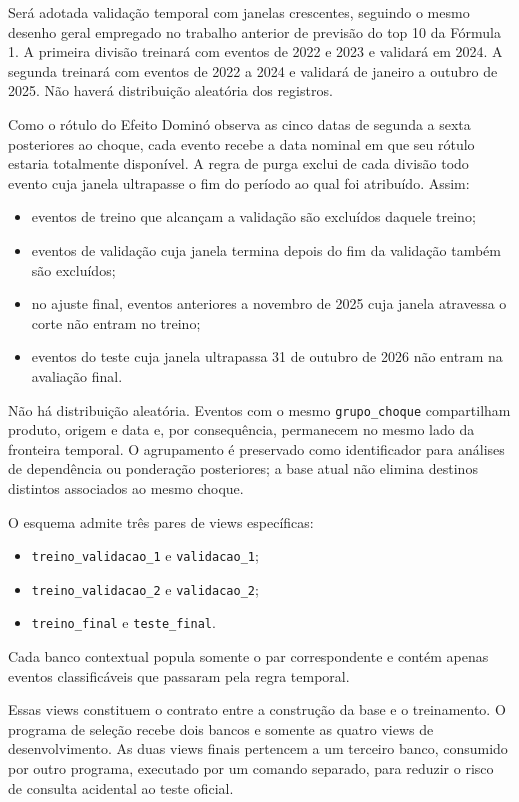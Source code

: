 \documentclass[12pt,a4paper]{article}
\begin{document}
Será adotada validação temporal com janelas crescentes, seguindo o mesmo desenho
geral empregado no trabalho anterior de previsão do top 10 da Fórmula 1. A
primeira divisão treinará com eventos de 2022 e 2023 e validará em 2024. A
segunda treinará com eventos de 2022 a 2024 e validará de janeiro a outubro de
2025. Não haverá distribuição aleatória dos registros.

Como o rótulo do Efeito Dominó observa as cinco datas de segunda a sexta
posteriores ao choque, cada evento recebe a data nominal em que seu rótulo
estaria totalmente disponível. A regra de purga exclui de cada divisão todo evento cuja janela
ultrapasse o fim do período ao qual foi atribuído. Assim:

\begin{itemize}
    \item eventos de treino que alcançam a validação são excluídos daquele
    treino;
    \item eventos de validação cuja janela termina depois do fim da validação
    também são excluídos;
    \item no ajuste final, eventos anteriores a novembro de 2025 cuja janela
    atravessa o corte não entram no treino;
    \item eventos do teste cuja janela ultrapassa 31 de outubro de 2026 não
    entram na avaliação final.
\end{itemize}

Não há distribuição aleatória. Eventos com o mesmo
\texttt{grupo\_choque} compartilham produto, origem e data e, por consequência,
permanecem no mesmo lado da fronteira temporal. O agrupamento é preservado como
identificador para análises de dependência ou ponderação posteriores; a base
atual não elimina destinos distintos associados ao mesmo choque.

O esquema admite três pares de views específicas:

\begin{itemize}
    \item \texttt{treino\_validacao\_1} e \texttt{validacao\_1};
    \item \texttt{treino\_validacao\_2} e \texttt{validacao\_2};
    \item \texttt{treino\_final} e \texttt{teste\_final}.
\end{itemize}

Cada banco contextual popula somente o par correspondente e contém apenas
eventos classificáveis que passaram pela regra temporal.

Essas views constituem o contrato entre a construção da base e o treinamento.
O programa de seleção recebe dois bancos e somente as quatro views de
desenvolvimento. As duas views finais pertencem a um terceiro banco, consumido
por outro programa, executado por um comando
separado, para reduzir o risco de consulta acidental ao teste oficial.
\end{document}

